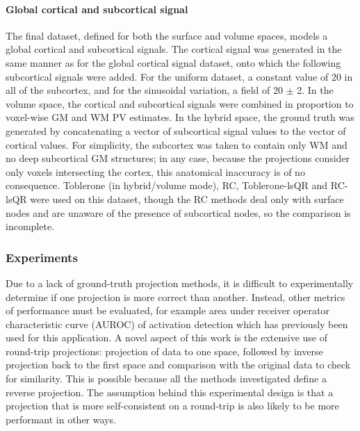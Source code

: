\documentclass[review]{elsarticle}
\begin{document}
\paragraph{Global cortical and subcortical signal}
The final dataset, defined for both the surface and volume spaces, models a global cortical and subcortical signals. The cortical signal was generated in the same manner as for the global cortical signal dataset, onto which the following subcortical signals were added. For the uniform dataset, a constant value of 20 in all of the subcortex, and for the sinusoidal variation, a field of 20 $\pm$ 2. In the volume space, the cortical and subcortical signals were combined in proportion to voxel-wise GM and WM PV estimates. In the hybrid space, the ground truth was generated by concatenating a vector of subcortical signal values to the vector of cortical values. For simplicity, the subcortex was taken to contain only WM and no deep subcortical GM structures; in any case, because the projections consider only voxels intersecting the cortex, this anatomical inaccuracy is of no consequence. Toblerone (in hybrid/volume mode), RC, Toblerone-lsQR and RC-lsQR were used on this dataset, though the RC methods deal only with surface nodes and are unaware of the presence of subcortical nodes, so the comparison is incomplete. 

\subsubsection{Experiments}
\label{methods:experiments}

Due to a lack of ground-truth projection methods, it is difficult to experimentally determine if one projection is more correct than another. Instead, other metrics of performance must be evaluated, for example area under receiver operator characteristic curve (AUROC) of activation detection which has previously been used for this application. A novel aspect of this work is the extensive use of round-trip projections: projection of data to one space, followed by inverse projection back to the first space and comparison with the original data to check for similarity. This is possible because all the methods investigated define a reverse projection. The assumption behind this experimental design is that a projection that is more self-consistent on a round-trip is also likely to be more performant in other ways. 
\end{document}

